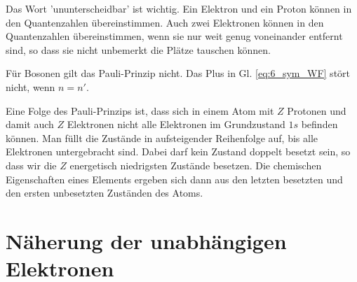 Das Wort 'ununterscheidbar' ist wichtig. Ein Elektron und ein Proton können in den Quantenzahlen übereinstimmen. Auch zwei Elektronen können in den Quantenzahlen übereinstimmen, wenn sie nur weit genug voneinander entfernt sind, so dass sie nicht unbemerkt die Plätze tauschen können. 

Für Bosonen gilt das Pauli-Prinzip nicht. Das Plus in Gl. \ref{eq:6_sym_WF} stört nicht, wenn $n = n'$.

Eine Folge des Pauli-Prinzips ist, dass sich in einem Atom mit $Z$ Protonen und damit auch $Z$ Elektronen nicht alle Elektronen im Grundzustand $1s$ befinden können. Man füllt die Zustände in aufsteigender Reihenfolge auf, bis alle Elektronen untergebracht sind. Dabei darf kein Zustand doppelt besetzt sein, so dass wir die $Z$ energetisch niedrigsten Zustände besetzen. Die chemischen Eigenschaften eines Elements ergeben sich dann aus den letzten besetzten und den ersten unbesetzten Zuständen des Atoms.


\section{Näherung der unabhängigen Elektronen}

